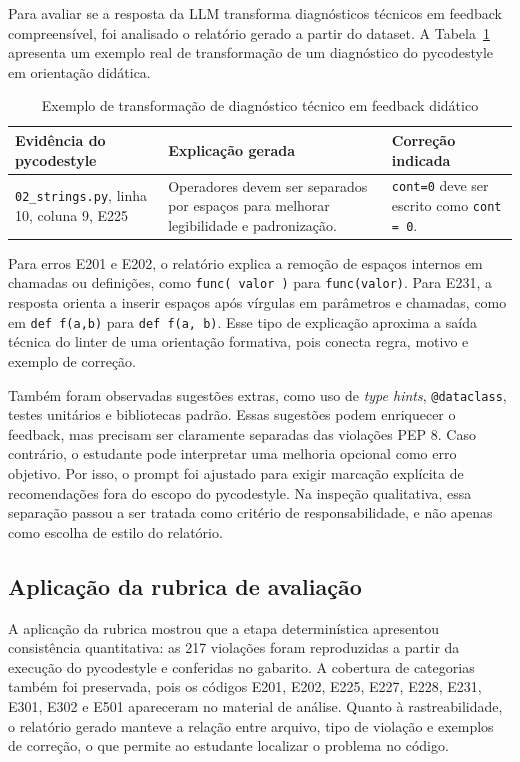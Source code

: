 \documentclass[12pt]{article}
\begin{document}
Para avaliar se a resposta da LLM transforma diagnósticos técnicos em feedback
compreensível, foi analisado o relatório gerado a partir do dataset. A
Tabela~\ref{tab:exemplo-saida} apresenta um exemplo real de transformação de um
diagnóstico do pycodestyle em orientação didática.

\begin{table}[ht]
\centering
\caption{Exemplo de transformação de diagnóstico técnico em feedback didático}
\label{tab:exemplo-saida}
\small
\begin{tabular}{p{3.5cm}p{4.5cm}p{4.3cm}}
\toprule
\textbf{Evidência do pycodestyle} & \textbf{Explicação gerada} & \textbf{Correção indicada}\\
\midrule
\texttt{02\_strings.py}, linha 10, coluna 9, E225 & Operadores devem ser
separados por espaços para melhorar legibilidade e padronização. &
\texttt{cont=0} deve ser escrito como \texttt{cont = 0}.\\
\bottomrule
\end{tabular}
\end{table}

Para erros E201 e E202, o relatório explica a remoção de espaços internos em
chamadas ou definições, como \texttt{func( valor )} para
\texttt{func(valor)}. Para E231, a resposta orienta a inserir espaços após
vírgulas em parâmetros e chamadas, como em \texttt{def f(a,b)} para
\texttt{def f(a, b)}. Esse tipo de explicação aproxima a saída técnica do
linter de uma orientação formativa, pois conecta regra, motivo e exemplo de
correção.

Também foram observadas sugestões extras, como uso de \textit{type hints},
\texttt{@dataclass}, testes unitários e bibliotecas padrão. Essas sugestões
podem enriquecer o feedback, mas precisam ser claramente separadas das violações
PEP 8. Caso contrário, o estudante pode interpretar uma melhoria opcional como
erro objetivo. Por isso, o prompt foi ajustado para exigir marcação explícita de
recomendações fora do escopo do pycodestyle. Na inspeção qualitativa, essa
separação passou a ser tratada como critério de responsabilidade, e não apenas
como escolha de estilo do relatório.

\subsection{Aplicação da rubrica de avaliação}

A aplicação da rubrica mostrou que a etapa determinística apresentou
consistência quantitativa: as 217 violações foram reproduzidas a partir da
execução do pycodestyle e conferidas no gabarito. A cobertura de categorias
também foi preservada, pois os códigos E201, E202, E225, E227, E228, E231, E301,
E302 e E501 apareceram no material de análise. Quanto à rastreabilidade, o
relatório gerado manteve a relação entre arquivo, tipo de violação e exemplos
de correção, o que permite ao estudante localizar o problema no código.
\end{document}
